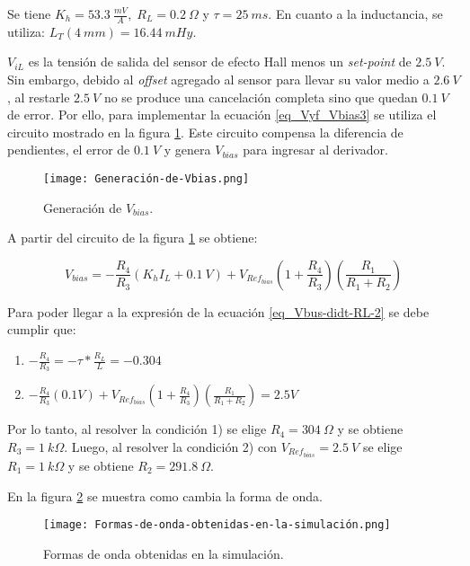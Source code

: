 \noindent Se tiene $K_h = 53.3\:\frac{mV}{A},\; R_L = 0.2\:\Omega$ y $\tau  = 25 \:ms$. En cuanto a la inductancia, se utiliza:  $L_T(4\:mm) = 16.44\:mHy$.

\noindent $V_{iL}$ es la tensi\'{o}n de salida del sensor de efecto Hall menos un \textsl{set-point} de $2.5\:V$. Sin embargo, debido al \textsl{offset} agregado al sensor para llevar su valor medio a $2.6\:V$, al restarle $2.5\:V$ no se produce una cancelaci\'{o}n completa sino que quedan $0.1\:V$ de error. Por ello, para implementar la ecuaci\'{o}n  \ref{eq_Vyf_Vbias3} se utiliza el circuito mostrado en la figura \ref{fig:img_Generación_de_Vbias}. Este circuito compensa la diferencia de pendientes, el error de $0.1\:V$ y genera $V_{bias}$ para ingresar al derivador.

\begin{figure}[H]
	\centering
	\texttt{[image: Generación-de-Vbias.png]}
	\caption{Generación de $V_{bias}$.}
	\label{fig:img_Generación_de_Vbias}
\end{figure}

\noindent A partir del circuito de la figura \ref{fig:img_Generación_de_Vbias} se obtiene:

\begin{equation} \label{eq_Vyf-Vbias3}
	V_{bias} =-\frac{R_4}{R_3}(K_hI_L+ 0.1\:V)+V_{Ref_{bias}}(1+\frac{ R_4}{R_3})(\frac{R_1}{R_1+R_2})
\end{equation}

\noindent Para poder llegar a la expresi\'{o}n de la ecuaci\'{o}n \ref{eq_Vbus-didt-RL-2} se debe cumplir que:

\begin{enumerate}
	\item  $-\frac{R_4}{R_3}=- \tau *\frac{R_L}{L}= -0.304$  
	
	\item  $-\frac{R_4}{R_3}(0.1V)+V_{Ref_{bias}}(1+\frac{ R_4}{R_3})(\frac{R_1}{R_1+R_2}) = 2.5V$     
\end{enumerate}

\noindent Por lo tanto, al resolver la condici\'{o}n 1) se elige $R_4 = 304\: \Omega$ y se obtiene $R_3=1\:k\Omega$. Luego, al resolver la condici\'{o}n 2) con $V_{Ref_{bias}}=2.5\:V$ se elige $R_1=1\:k\Omega$ y se obtiene $R_{2}=291.8\:\Omega$.

\noindent En la figura \ref{fig:img_Formas_de_onda_obtenidas_en_la_simulación} se muestra como cambia la forma de onda.

\begin{figure}[H]
	\centering
	\texttt{[image: Formas-de-onda-obtenidas-en-la-simulación.png]}
	\caption{Formas de onda obtenidas en la simulación.}
	\label{fig:img_Formas_de_onda_obtenidas_en_la_simulación}
\end{figure}

